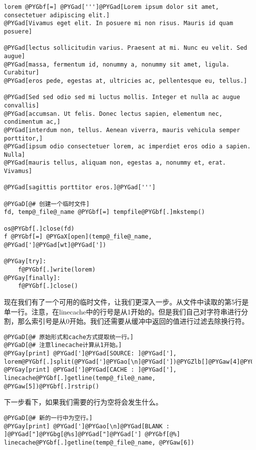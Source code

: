 \documentclass[letterpaper,10pt,english]{manual}
\begin{document}
\begin{Verbatim}[commandchars=@\[\]]
lorem @PYGbf[=] @PYGad[''']@PYGad[Lorem ipsum dolor sit amet, consectetuer adipiscing elit.]
@PYGad[Vivamus eget elit. In posuere mi non risus. Mauris id quam posuere]

@PYGad[lectus sollicitudin varius. Praesent at mi. Nunc eu velit. Sed augue]
@PYGad[massa, fermentum id, nonummy a, nonummy sit amet, ligula. Curabitur]
@PYGad[eros pede, egestas at, ultricies ac, pellentesque eu, tellus.]

@PYGad[Sed sed odio sed mi luctus mollis. Integer et nulla ac augue convallis]
@PYGad[accumsan. Ut felis. Donec lectus sapien, elementum nec, condimentum ac,]
@PYGad[interdum non, tellus. Aenean viverra, mauris vehicula semper porttitor,]
@PYGad[ipsum odio consectetuer lorem, ac imperdiet eros odio a sapien. Nulla]
@PYGad[mauris tellus, aliquam non, egestas a, nonummy et, erat. Vivamus]

@PYGad[sagittis porttitor eros.]@PYGad[''']

@PYGaD[@# 创建一个临时文件]
fd, temp@_file@_name @PYGbf[=] tempfile@PYGbf[.]mkstemp()

os@PYGbf[.]close(fd)
f @PYGbf[=] @PYGaX[open](temp@_file@_name, @PYGad[']@PYGad[wt]@PYGad['])

@PYGay[try]:
    f@PYGbf[.]write(lorem)
@PYGay[finally]:
    f@PYGbf[.]close()
\end{Verbatim}

现在我们有了一个可用的临时文件，让我们更深入一步。从文件中读取的第5行是单一行。注意，在linecache中的行号是从1开始的。但是我们自己对字符串进行分割，那么索引号是从0开始。我们还需要从缓冲中返回的值进行过滤去除换行符。

\begin{Verbatim}[commandchars=@\[\]]
@PYGaD[@# 原始形式和cache方式提取统一行。]
@PYGaD[@# 注意linecache计算从1开始。]
@PYGay[print] @PYGad[']@PYGad[SOURCE: ]@PYGad['], lorem@PYGbf[.]split(@PYGad[']@PYGao[\n]@PYGad['])@PYGZlb[]@PYGaw[4]@PYGZrb[]
@PYGay[print] @PYGad[']@PYGad[CACHE : ]@PYGad['], linecache@PYGbf[.]getline(temp@_file@_name, @PYGaw[5])@PYGbf[.]rstrip()
\end{Verbatim}

下一步看下，如果我们需要的行为空将会发生什么。

\begin{Verbatim}[commandchars=@\[\]]
@PYGaD[@# 新的一行中为空行。]
@PYGay[print] @PYGad[']@PYGao[\n]@PYGad[BLANK : ]@PYGad["]@PYGbg[@%s]@PYGad["]@PYGad['] @PYGbf[@%] linecache@PYGbf[.]getline(temp@_file@_name, @PYGaw[6])
\end{Verbatim}
\end{document}
